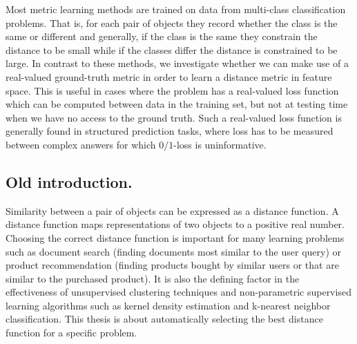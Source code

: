Most metric learning methods are trained on data from multi-class classification problems. That is, for each pair of objects they record whether the class is the same or different and generally, if the class is the same they constrain the distance to be small while if the classes differ the distance is constrained to be large. In contrast to these methods, we investigate whether we can make use of a real-valued ground-truth metric in order to learn a distance metric in feature space. This is useful in cases where the problem has a real-valued loss function which can be computed between data in the training set, but not at testing time when we have no access to the ground truth. Such a real-valued loss function is generally found in structured prediction tasks, where loss has to be measured between complex answers for which $0/1$-loss is uninformative.



\subsection*{Old introduction.}

Similarity between a pair of objects can be expressed as a distance function. A distance function maps representations of two objects to a positive real number. Choosing the correct distance function is important for many learning problems such as document search (finding documents most similar to the user query) or product recommendation (finding products bought by similar users or that are similar to the purchased product). It is also the defining factor in the effectiveness of unsupervised clustering techniques and non-parametric supervised learning algorithms such as kernel density estimation and k-nearest neighbor classification. This thesis is about automatically selecting the best distance function for a specific problem.

